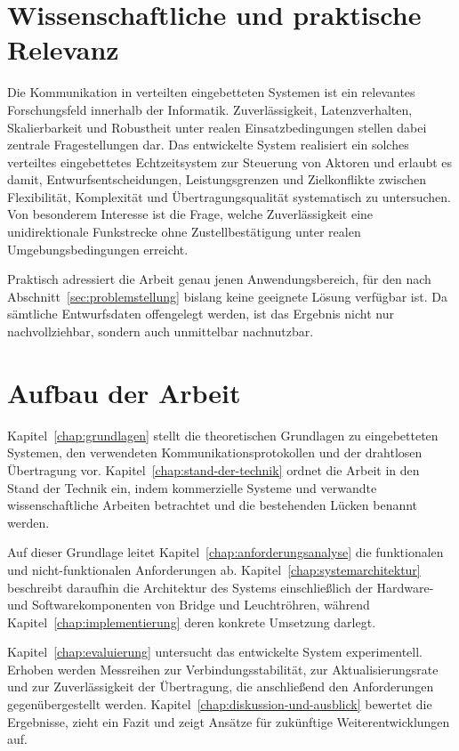 \section{Wissenschaftliche und praktische Relevanz}
\label{sec:wissenschaftliche-und-praktische-relevanz}

Die Kommunikation in verteilten eingebetteten Systemen ist ein relevantes
Forschungsfeld innerhalb der Informatik. Zuverlässigkeit, Latenzverhalten,
Skalierbarkeit und Robustheit unter realen Einsatzbedingungen stellen dabei
zentrale Fragestellungen dar. Das entwickelte System realisiert ein solches
verteiltes eingebettetes Echtzeitsystem zur Steuerung von Aktoren und erlaubt es
damit, Entwurfsentscheidungen, Leistungsgrenzen und Zielkonflikte zwischen
Flexibilität, Komplexität und Übertragungsqualität systematisch zu untersuchen.
Von besonderem Interesse ist die Frage, welche Zuverlässigkeit eine
unidirektionale Funkstrecke ohne Zustellbestätigung unter realen
Umgebungsbedingungen erreicht.

Praktisch adressiert die Arbeit genau jenen Anwendungsbereich, für den nach
Abschnitt~\ref{sec:problemstellung} bislang keine geeignete Lösung verfügbar ist.
Da sämtliche Entwurfsdaten offengelegt werden, ist das Ergebnis nicht nur
nachvollziehbar, sondern auch unmittelbar nachnutzbar.

\section{Aufbau der Arbeit}
\label{sec:aufbau-der-arbeit}

Kapitel~\ref{chap:grundlagen} stellt die theoretischen Grundlagen zu
eingebetteten Systemen, den verwendeten Kommunikationsprotokollen und der
drahtlosen Übertragung vor. Kapitel~\ref{chap:stand-der-technik} ordnet die
Arbeit in den Stand der Technik ein, indem kommerzielle Systeme und verwandte
wissenschaftliche Arbeiten betrachtet und die bestehenden Lücken benannt werden.

Auf dieser Grundlage leitet Kapitel~\ref{chap:anforderungsanalyse} die
funktionalen und nicht-funktionalen Anforderungen ab.
Kapitel~\ref{chap:systemarchitektur} beschreibt daraufhin die Architektur des
Systems einschließlich der Hardware- und Softwarekomponenten von Bridge und
Leuchtröhren, während Kapitel~\ref{chap:implementierung} deren konkrete Umsetzung
darlegt.

Kapitel~\ref{chap:evaluierung} untersucht das entwickelte System experimentell.
Erhoben werden Messreihen zur Verbindungsstabilität, zur Aktualisierungsrate und
zur Zuverlässigkeit der Übertragung, die anschließend den Anforderungen
gegenübergestellt werden. Kapitel~\ref{chap:diskussion-und-ausblick} bewertet die
Ergebnisse, zieht ein Fazit und zeigt Ansätze für zukünftige Weiterentwicklungen
auf.
